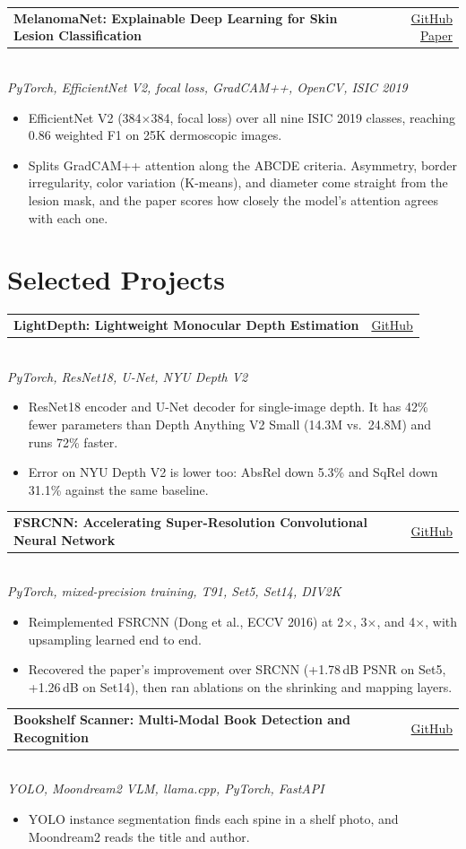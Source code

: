 \documentclass[letterpaper,11pt]{article}
\makeatletter
\newcommand{\projectEntry}[3]{%
    \vspace{2pt}\noindent
    \begin{tabular*}{\textwidth}{@{}l@{\extracolsep{\fill}}r@{}}
        {\textbf{\color{accent}#1}} & {\small\href{#3}{\color{linkcolor}GitHub}} \\
    \end{tabular*}\vspace{-3pt}\\
    {\small\color{lighttext}\textit{#2}}\vspace{-2pt}
}
\newcommand{\projectEntryPaper}[4]{%
    \vspace{2pt}\noindent
    \begin{tabular*}{\textwidth}{@{}l@{\extracolsep{\fill}}r@{}}
        {\textbf{\color{accent}#1}} & {\small\href{#3}{\color{linkcolor}GitHub} \enspace\color{lighttext}\textbar\enspace \href{#4}{\color{linkcolor}Paper}} \\
    \end{tabular*}\vspace{-3pt}\\
    {\small\color{lighttext}\textit{#2}}\vspace{-2pt}
}
\makeatother
\begin{document}
\projectEntryPaper{MelanomaNet: Explainable Deep Learning for Skin Lesion Classification}{PyTorch, EfficientNet V2, focal loss, GradCAM++, OpenCV, ISIC 2019}
{https://github.com/suxrobgm/explainable-melanoma}
{https://arxiv.org/abs/2512.09289}
\begin{itemize}
    \item EfficientNet V2 (384$\times$384, focal loss) over all nine ISIC 2019 classes, reaching 0.86 weighted F1 on 25K dermoscopic images.
    \item Splits GradCAM++ attention along the ABCDE criteria. Asymmetry, border irregularity, color variation (K-means), and diameter come straight from the lesion mask, and the paper scores how closely the model's attention agrees with each one.
\end{itemize}

\section{Selected Projects}

\projectEntry{LightDepth: Lightweight Monocular Depth Estimation}{PyTorch, ResNet18, U-Net, NYU Depth V2}
{https://github.com/suxrobgm/lightdepth}
\begin{itemize}
    \item ResNet18 encoder and U-Net decoder for single-image depth. It has 42\% fewer parameters than Depth Anything V2 Small (14.3M vs.\ 24.8M) and runs 72\% faster.
    \item Error on NYU Depth V2 is lower too: AbsRel down 5.3\% and SqRel down 31.1\% against the same baseline.
\end{itemize}

\projectEntry{FSRCNN: Accelerating Super-Resolution Convolutional Neural Network}{PyTorch, mixed-precision training, T91, Set5, Set14, DIV2K}
{https://github.com/suxrobgm/fsrcnn}
\begin{itemize}
    \item Reimplemented FSRCNN (Dong et al., ECCV 2016) at 2$\times$, 3$\times$, and 4$\times$, with upsampling learned end to end.
    \item Recovered the paper's improvement over SRCNN (+1.78\,dB PSNR on Set5, +1.26\,dB on Set14), then ran ablations on the shrinking and mapping layers.
\end{itemize}

\projectEntry{Bookshelf Scanner: Multi-Modal Book Detection and Recognition}{YOLO, Moondream2 VLM, llama.cpp, PyTorch, FastAPI}
{https://github.com/suxrobgm/bookshelf-scanner}
\begin{itemize}
    \item YOLO instance segmentation finds each spine in a shelf photo, and Moondream2 reads the title and author.
\end{itemize}
\end{document}
